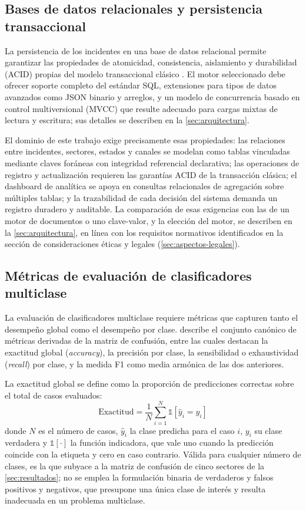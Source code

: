 \subsection{Bases de datos relacionales y persistencia transaccional}\label{subsec:bd-relacionales}

La persistencia de los incidentes en una base de datos relacional permite garantizar las propiedades de atomicidad, consistencia, aislamiento y durabilidad (ACID) propias del modelo transaccional clásico \parencite{Date2004_database}. El motor seleccionado debe ofrecer soporte completo del estándar SQL, extensiones para tipos de datos avanzados como JSON binario y arreglos, y un modelo de concurrencia basado en control multiversional (MVCC) que resulte adecuado para cargas mixtas de lectura y escritura; sus detalles se describen en la \autoref{sec:arquitectura}.

El dominio de este trabajo exige precisamente esas propiedades: las relaciones entre incidentes, sectores, estados y canales se modelan como tablas vinculadas mediante claves foráneas con integridad referencial declarativa; las operaciones de registro y actualización requieren las garantías ACID de la transacción clásica; el dashboard de analítica se apoya en consultas relacionales de agregación sobre múltiples tablas; y la trazabilidad de cada decisión del sistema demanda un registro duradero y auditable. La comparación de esas exigencias con las de un motor de documentos o uno clave-valor, y la elección del motor, se describen en la \autoref{sec:arquitectura}, en línea con los requisitos normativos identificados en la sección de consideraciones éticas y legales (\autoref{sec:aspectos-legales}).

\subsection{Métricas de evaluación de clasificadores multiclase}
\label{sec:metricas-multiclase}

La evaluación de clasificadores multiclase requiere métricas que capturen tanto el desempeño global como el desempeño por clase. \textcite{Powers2011_evaluation} describe el conjunto canónico de métricas derivadas de la matriz de confusión, entre las cuales destacan la exactitud global (\emph{accuracy}), la precisión por clase, la sensibilidad o exhaustividad (\emph{recall}) por clase, y la medida F1 como media armónica de las dos anteriores.

La exactitud global se define como la proporción de predicciones correctas sobre el total de casos evaluados:
\[
\text{Exactitud} = \frac{1}{N} \sum_{i=1}^{N} \mathbb{1}[\hat{y}_{i} = y_{i}]
\]
donde \(N\) es el número de casos, \(\hat{y}_{i}\) la clase predicha para el caso \(i\), \(y_{i}\) su clase verdadera y \(\mathbb{1}[\cdot]\) la función indicadora, que vale uno cuando la predicción coincide con la etiqueta y cero en caso contrario. Válida para cualquier número de clases, es la que subyace a la matriz de confusión de cinco sectores de la \autoref{sec:resultados}; no se emplea la formulación binaria de verdaderos y falsos positivos y negativos, que presupone una única clase de interés y resulta inadecuada en un problema multiclase.

